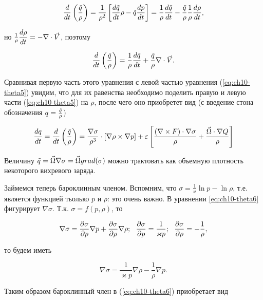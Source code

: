 \begin{equation*}
    \displaystyle\frac{d }{d t} \displaystyle \left( \frac{\Tilde{q}}{\rho} \right) = \frac{1}{\rho^2} \displaystyle \left[ \displaystyle\frac{d \Tilde{q}}{d t}\rho - \Tilde{q}\displaystyle\frac{d p}{d t} \right] = \frac{1}{\rho}\displaystyle\frac{d \Tilde{q}}{d t} - \frac{\Tilde{q}}{\rho}\frac{1}{\rho}\displaystyle\frac{d \rho}{d t},
\end{equation*}

но $\frac{1}{\rho}\displaystyle\frac{d \rho}{d t}=-\nabla\cdot\vec{V}$, поэтому

\begin{equation*}
    \displaystyle\frac{d }{d t} \displaystyle \left(  \frac{\Tilde{q}}{\rho}  \right) = \frac{1}{\rho}\displaystyle\frac{d \Tilde{q}}{d t} + \frac{\Tilde{q}}{\rho}\nabla\cdot\vec{V}.
\end{equation*}

Сравнивая первую часть этого уравнения с левой частью уравнения (\ref{eq:ch10-theta5}) увидим, что для их равенства необходимо поделить правую и левую части (\ref{eq:ch10-theta5}) на $\rho$, после чего оно приобретет вид (с введение стона обозначения $q=\frac{\Tilde{q}}{\rho}$) 

\begin{equation}
\label{eq:ch10-theta6}
    \displaystyle\frac{d q}{d t} = 
    \displaystyle\frac{d }{d t} \displaystyle \left(  \frac{\Tilde{q}}{\rho}  \right) = 
    \frac{\nabla\sigma}{\rho^3} \cdot \displaystyle \left[ \nabla\rho\times\nabla p \right] + 
    \varepsilon \displaystyle \left[  \frac{ (\nabla\times F)\cdot\nabla\sigma }{\rho} + 
    \frac{\vec{\Omega}\cdot\nabla Q}{\rho}  \right]
\end{equation}

Величину $\Tilde{q}=\vec{\Omega}\nabla\sigma=\vec{\Omega}grad(\sigma)$ можно трактовать как объемную плотность некоторого вихревого заряда. 

Займемся теперь бароклинным членом. Вспомним, что $\sigma=\frac{1}{\varkappa}\ln{p}-\ln{\rho}$, т.е. является функцией тьолько $p$ и $\rho$: это очень важно. В уравнении \ref{eq:ch10-theta6} фигурирует $\nabla\sigma$. Т.к. $\sigma=f(p,\rho)$, то

\begin{equation}
    \label{eq:ch10-theta7}
    \nabla\sigma=\displaystyle\frac{\partial \sigma}{\partial p}\nabla p + \displaystyle\frac{\partial \sigma}{\partial \rho}\nabla \rho; \:\:\: \displaystyle\frac{\partial \sigma}{\partial p}=\frac{1}{\varkappa p}; \:\:\: \displaystyle\frac{\partial \sigma}{\partial \rho}=-\frac{1}{\rho},
\end{equation}

то будем иметь

\begin{equation}
    \label{eq:ch10-theta8}
    \nabla\sigma=\frac{1}{\varkappa p}\nabla\rho - \frac{1}{\rho}\nabla p.
\end{equation}

Таким образом бароклинный член в (\ref{eq:ch10-theta6}) приобретает вид

